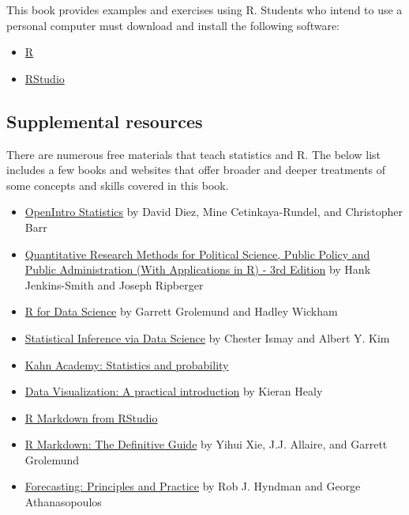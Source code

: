 \documentclass[
]{book}
\providecommand{\tightlist}{%
  \setlength{\itemsep}{0pt}\setlength{\parskip}{0pt}}
\begin{document}
This book provides examples and exercises using R. Students who intend to use a personal computer must download and install the following software:

\begin{itemize}
\tightlist
\item
  \href{https://cloud.r-project.org}{R}
\item
  \href{https://rstudio.com/products/rstudio/download/}{RStudio}
\end{itemize}

\hypertarget{supplemental-resources}{%
\subsection*{Supplemental resources}\label{supplemental-resources}}

There are numerous free materials that teach statistics and R. The below list includes a few books and websites that offer broader and deeper treatments of some concepts and skills covered in this book.

\begin{itemize}
\tightlist
\item
  \href{https://www.openintro.org/book/os/}{OpenIntro Statistics} by David Diez, Mine Cetinkaya-Rundel, and Christopher Barr
\item
  \href{https://open.umn.edu/opentextbooks/textbooks/quantitative-research-methods-for-political-science-public-policy-and-public-administration-with-applications-in-r-3rd-edition}{Quantitative Research Methods for Political Science, Public Policy and Public Administration (With Applications in R) - 3rd Edition} by Hank Jenkins-Smith and Joseph Ripberger
\item
  \href{https://r4ds.had.co.nz}{R for Data Science} by Garrett Grolemund and Hadley Wickham
\item
  \href{https://moderndive.com/index.html}{Statistical Inference via Data Science} by Chester Ismay and Albert Y. Kim
\item
  \href{https://www.khanacademy.org/math/statistics-probability}{Kahn Academy: Statistics and probability}
\item
  \href{https://socviz.co/index.html\#preface}{Data Visualization: A practical introduction} by Kieran Healy
\item
  \href{https://rmarkdown.rstudio.com/lesson-1.html}{R Markdown from RStudio}
\item
  \href{https://bookdown.org/yihui/rmarkdown/}{R Markdown: The Definitive Guide} by Yihui Xie, J.J. Allaire, and Garrett Grolemund
\item
  \href{https://otexts.com/fpp2/}{Forecasting: Principles and Practice} by Rob J. Hyndman and George Athanasopoulos
\end{itemize}
\end{document}
